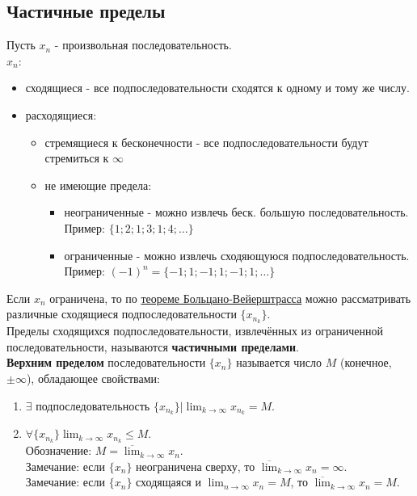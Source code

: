 \documentclass[12pt]{article}
\begin{document}
    \subsection{Частичные пределы}
    \noindent Пусть $x_n$ - произвольная последовательность.\\
    $x_n$:
    \begin{itemize}
        \item сходящиеся - все подпоследовательности сходятся к одному и тому же числу.
        \item расходящиеся:
              \begin{itemize}
                \item стремящиеся к бесконечности - все подпоследовательности будут стремиться к $\infty$
                \item не имеющие предела:
                      \begin{itemize}
                        \item неограниченные - можно извлечь беск. большую последовательность.\\Пример: $\{1; 2; 1; 3; 1; 4; \dots\}$
                        \item ограниченные - можно извлечь сходяющуюся подпоследовательность.\\Пример: $(-1)^n = \{-1; 1; -1; 1; -1; 1; \dots\}$
                      \end{itemize}
              \end{itemize}
    \end{itemize}
    Если $x_n$ ограничена, то по \hyperref[th:2.8.1]{теореме Больцано-Вейерштрасса} можно рассматривать различные сходящиеся подпоследовательности $\{x_{n_{k}}\}$.\\
    Пределы сходящихся подпоследовательности, извлечённых из ограниченной последовательности, называются \textbf{частичными пределами}.\\
    \textbf{Верхним пределом} последовательности $\{x_n\}$ называется число $M$ (конечное, $\pm \infty$), обладающее свойствами:
    \begin{enumerate}
        \item $\exists$ подпоследовательность $\{x_{n_{k}}\} \Big| \lim_{k\to\infty}x_{n_{k}} = M$.
        \item $\forall \{x_{n_{k}}\} \lim_{k\to\infty} x_{n_{k}} \le M$.\\
        Обозначение: $M = \overline{\lim}_{k\to\infty}x_n$.\\
        Замечание: если $\{x_n\}$ неограничена сверху, то $\overline{\lim}_{k\to\infty}x_n = \infty$.\\
        Замечание: если $\{x_n\}$ сходящаяся и $\lim_{n\to\infty} x_n = M$, то $\overline{\lim}_{k\to\infty}x_n = M$.
    \end{enumerate}
\end{document}
